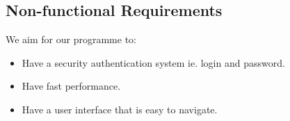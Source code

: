 \subsection{Non-functional Requirements}
We aim for our programme to:
\begin{itemize}
    \item Have a security authentication system ie. login and password.
    \item Have fast performance.
    \item Have a user interface that is easy to navigate.
\end{itemize}
